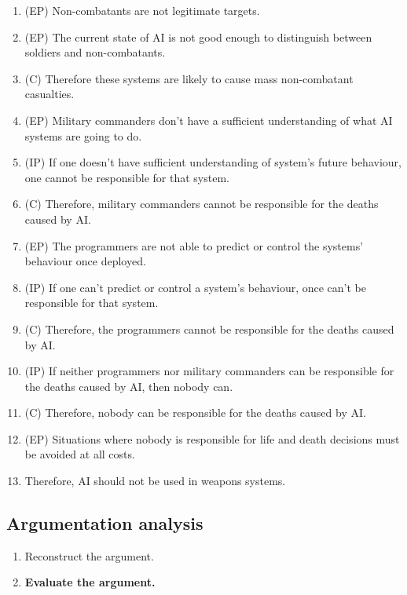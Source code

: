 \begin{enumerate}
    \item (EP) Non-combatants are not legitimate targets.
    \item (EP) The current state of AI is not good enough to distinguish
        between soldiers and non-combatants.
    \item (C) Therefore these systems are likely to cause mass non-combatant
        casualties.
    \item (EP) Military commanders don't have a sufficient understanding
        of what AI systems are going to do.
    \item (IP) If one doesn't have sufficient understanding of system's
        future behaviour, one cannot be responsible for that system.
    \item (C) Therefore, military commanders cannot be responsible for
        the deaths caused by AI.
    \item (EP) The programmers are not able to predict or control the
        systems' behaviour once deployed.
    \item (IP) If one can't predict or control a system's behaviour,
        once can't be responsible for that system.
    \item (C) Therefore, the programmers cannot be responsible for the
        deaths caused by AI.
    \item (IP) If neither programmers nor military commanders can be
        responsible for the deaths caused by AI, then nobody can.
    \item (C) Therefore, nobody can be responsible for the deaths
        caused by AI.
    \item (EP) Situations where nobody is responsible for life and
        death decisions must be avoided at all costs.
    \item Therefore, AI should not be used in weapons systems.
\end{enumerate}

\subsection{Argumentation analysis}

\begin{enumerate}
    \item Reconstruct the argument.
    \item \textbf{Evaluate the argument.}
\end{enumerate}


